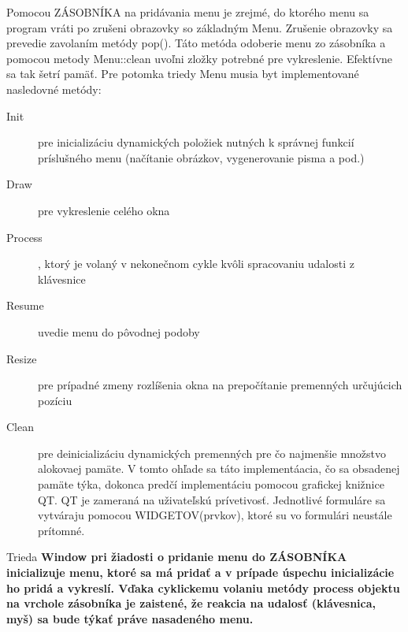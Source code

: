 Pomocou ZÁSOBNÍKA na pridávania menu je zrejmé, do ktorého menu sa program vráti po zrušeni obrazovky so základným Menu. Zrušenie obrazovky sa prevedie zavolaním metódy pop(). Táto metóda odoberie menu zo zásobníka a pomocou metody Menu::clean uvoľni zložky potrebné pre vykreslenie. Efektívne sa tak šetrí pamäť. Pre potomka triedy Menu musia byt implementované nasledovné metódy:
\begin{description}
\item [Init] pre inicializáciu dynamických položiek nutných k správnej funkcií príslušného menu (načítanie obrázkov, vygenerovanie pisma a pod.)
\item [Draw] pre vykreslenie celého okna
\item [Process], ktorý je volaný v nekonečnom cykle  kvôli spracovaniu udalosti z klávesnice
\item [Resume] uvedie menu do pôvodnej podoby
\item [Resize] pre prípadné zmeny rozlíšenia okna na prepočítanie premenných určujúcich pozíciu
\item [Clean] pre deinicializáciu dynamických premenných pre čo najmenšie množstvo alokovaej pamäte. V tomto ohľade sa táto implementáacia, čo sa obsadenej pamäte týka, dokonca predčí implementáciu  pomocou grafickej knižnice QT. QT je zameraná na uživateľskú prívetivosť. Jednotlivé formuláre sa vytváraju pomocou WIDGETOV(prvkov), ktoré su vo formulári neustále prítomné. %
\end{description}
Trieda \bf{Window} pri žiadosti o pridanie menu do ZÁSOBNÍKA inicializuje menu, ktoré sa má pridať a v prípade úspechu inicializácie ho pridá a vykreslí. Vďaka cyklickemu volaniu metódy process objektu na vrchole zásobníka je zaistené, že reakcia na udalosť (klávesnica, myš)  sa bude týkať práve nasadeného menu.   %
